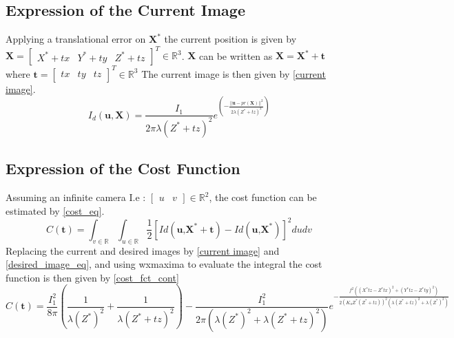 \subsection{Expression of the Current Image}
Applying a translational error on $\textbf{X}^{*}$ the current position is given by $\textbf{X} = \begin{bmatrix}
    X^{*} + tx & Y^{*} + ty & Z^{*} + tz
\end{bmatrix}^{T} \in \mathbb{R}^{3}$. $\textbf{X}$ can be written as $\textbf{X} = \textbf{X}^{*} + \textbf{t}$ where $\textbf{t} = \begin{bmatrix}
    tx & ty & tz
\end{bmatrix}^{T}\in \mathbb{R}^{3}$ The current image is then given by \eqref{current image}.
\begin{equation}
    I_{d}(\textbf{u},\textbf{X})=\frac{I_{1}}{2\pi\lambda(Z^{*}+tz)^{2}} e^{\left(-\frac{||\textbf{u}-pr(\textbf{X})||^{2}}{2\lambda(Z^{*}+tz)^{2}}\right)}
    \label{current image}
\end{equation}

\subsection{Expression of the Cost Function}
Assuming an infinite camera I.e : $\begin{bmatrix} u & v \end{bmatrix} \in \mathbb{R}^{2}$, the cost function can be estimated by \eqref{cost_eq}.
\begin{equation}
    C(\textbf{t}) = \int_{v\in\mathbb{R}}\int_{u\in\mathbb{R}} \frac{1}{2}\left[Id\left(\textbf{u,X}^{*}+\textbf{t}\right) - Id\left(\textbf{u,X}^{*}\right)\right]^{2} du dv
    \label{cost_eq}
\end{equation}
Replacing the current and desired images by \eqref{current image} and \eqref{desired_image_eq}, and using wxmaxima to evaluate the integral the cost function is then given by \eqref{cost_fct_cont}
\begin{equation}
    C(\textbf{t}) = \frac{I_{1}^{2}}{8\pi}\left(\frac{1}{\lambda(Z^{*})^{2}}+\frac{1}{\lambda(Z^{*}+tz)^{2}}\right) -\frac{I_{1}^{2}}{2\pi(\lambda(Z^{*})^{2}+\lambda(Z^{*}+tz)^2)}e^{-\frac{f^{2}\left((X^{*}tz-Z^{*}tx)^{2}+(Y^{*}tz-Z^{*}ty)^{2}\right)}{2(K_{u}Z^{*}(Z^{*}+tz))^{2}(\lambda(Z^{*}+tz)^{2}+\lambda(Z^{*})^{2})}}
    \label{cost_fct_cont}
\end{equation}
